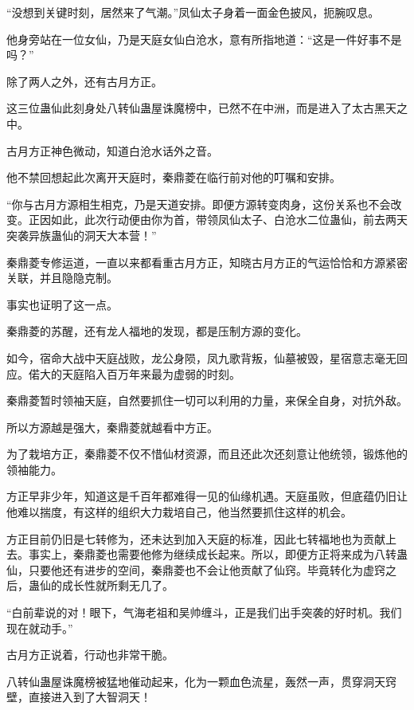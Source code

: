 
\begin{this_body}

“没想到关键时刻，居然来了气潮。”凤仙太子身着一面金色披风，扼腕叹息。

他身旁站在一位女仙，乃是天庭女仙白沧水，意有所指地道：“这是一件好事不是吗？”

除了两人之外，还有古月方正。

这三位蛊仙此刻身处八转仙蛊屋诛魔榜中，已然不在中洲，而是进入了太古黑天之中。

古月方正神色微动，知道白沧水话外之音。

他不禁回想起此次离开天庭时，秦鼎菱在临行前对他的叮嘱和安排。

“你与古月方源相生相克，乃是天道安排。即便方源转变肉身，这份关系也不会改变。正因如此，此次行动便由你为首，带领凤仙太子、白沧水二位蛊仙，前去两天突袭异族蛊仙的洞天大本营！”

秦鼎菱专修运道，一直以来都看重古月方正，知晓古月方正的气运恰恰和方源紧密关联，并且隐隐克制。

事实也证明了这一点。

秦鼎菱的苏醒，还有龙人福地的发现，都是压制方源的变化。

如今，宿命大战中天庭战败，龙公身陨，凤九歌背叛，仙墓被毁，星宿意志毫无回应。偌大的天庭陷入百万年来最为虚弱的时刻。

秦鼎菱暂时领袖天庭，自然要抓住一切可以利用的力量，来保全自身，对抗外敌。

所以方源越是强大，秦鼎菱就越看中方正。

为了栽培方正，秦鼎菱不仅不惜仙材资源，而且还此次还刻意让他统领，锻炼他的领袖能力。

方正早非少年，知道这是千百年都难得一见的仙缘机遇。天庭虽败，但底蕴仍旧让他难以揣度，有这样的组织大力栽培自己，他当然要抓住这样的机会。

方正目前仍旧是七转修为，还未达到加入天庭的标准，因此七转福地也为贡献上去。事实上，秦鼎菱也需要他修为继续成长起来。所以，即便方正将来成为八转蛊仙，只要他还有进步的空间，秦鼎菱也不会让他贡献了仙窍。毕竟转化为虚窍之后，蛊仙的成长性就所剩无几了。

“白前辈说的对！眼下，气海老祖和吴帅缠斗，正是我们出手突袭的好时机。我们现在就动手。”

古月方正说着，行动也非常干脆。

八转仙蛊屋诛魔榜被猛地催动起来，化为一颗血色流星，轰然一声，贯穿洞天窍壁，直接进入到了大智洞天！


\end{this_body}
